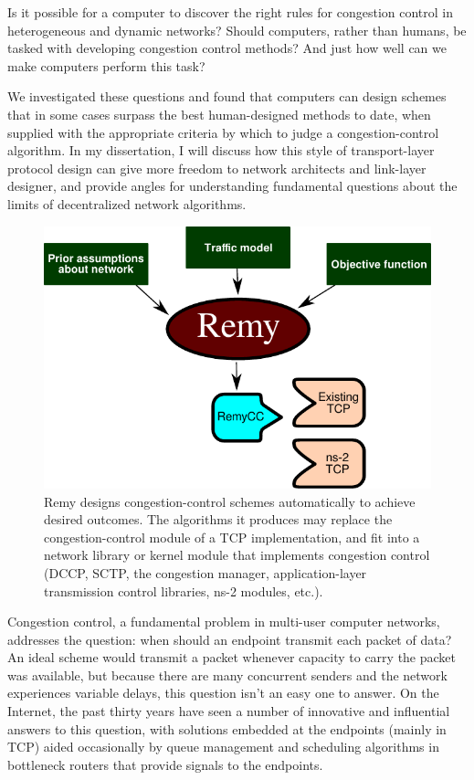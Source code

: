\documentclass{article}
\begin{document}
\vspace{\baselineskip}

Is it possible for a computer to discover the right rules for
congestion control in heterogeneous and dynamic networks? Should
computers, rather than humans, be tasked with developing congestion
control methods?  And just how well can we make computers perform this
task?

We investigated these questions and found that computers can design
schemes that in some cases surpass the best human-designed methods to
date, when supplied with the appropriate criteria by which to judge a
congestion-control algorithm. In my dissertation, I will discuss how
this style of transport-layer protocol design can give more freedom to
network architects and link-layer designer, and provide angles for
understanding fundamental questions about the limits of decentralized
network algorithms.

\begin{figure}
\vspace{\baselineskip}
\begin{centering}
\includegraphics[width=6 cm]{remy.pdf}
\caption{Remy designs congestion-control schemes automatically to
  achieve desired outcomes. The algorithms it produces may replace
the congestion-control module of a TCP implementation, and fit into
a network library or kernel module that implements congestion
control (DCCP, SCTP, the congestion manager, application-layer
transmission control libraries, ns-2 modules, etc.).}

\end{centering}

\end{figure}

Congestion control, a fundamental problem in multi-user computer
networks, addresses the question: when should an endpoint transmit
each packet of data? An ideal scheme would transmit a packet whenever
capacity to carry the packet was available, but because there are many
concurrent senders and the network experiences variable delays, this
question isn't an easy one to answer. On the Internet, the past thirty
years have seen a number of innovative and influential answers to this
question, with solutions embedded at the endpoints (mainly in TCP)
aided occasionally by queue management and scheduling algorithms in
bottleneck routers that provide signals to the endpoints.
\end{document}
